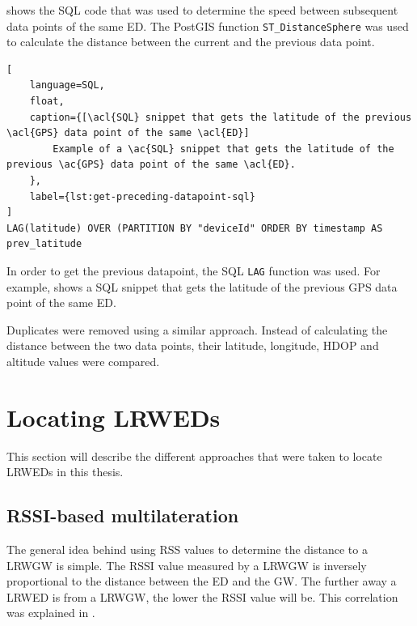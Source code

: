  shows the \ac{SQL} code that was used to determine the speed between subsequent data points of the same \acl{ED}.
The PostGIS function \lstinline|ST_DistanceSphere| was used to calculate the distance between the current and the previous data point.

\begin{lstlisting}[
    language=SQL,
    float,
    caption={[\acl{SQL} snippet that gets the latitude of the previous \acl{GPS} data point of the same \acl{ED}]
        Example of a \ac{SQL} snippet that gets the latitude of the previous \ac{GPS} data point of the same \acl{ED}.
    },
    label={lst:get-preceding-datapoint-sql}
]
LAG(latitude) OVER (PARTITION BY "deviceId" ORDER BY timestamp AS prev_latitude
\end{lstlisting}

In order to get the previous datapoint, the SQL \lstinline|LAG| function was used.
For example,  shows a \ac{SQL} snippet that gets the latitude of the previous \ac{GPS} data point of the same \acl{ED}.

Duplicates were removed using a similar approach.
Instead of calculating the distance between the two data points, their latitude, longitude, \ac{HDOP} and altitude values were compared.

\section{Locating \aclp{LRWED}}

This section will describe the different approaches that were taken to locate \aclp{LRWED} in this thesis.

\subsection{\acs{RSSI}-based multilateration}\label{sec:rssi-based-multilateration-implementation}

The general idea behind using \ac{RSS} values to determine the distance to a \acl{LRWGW} is simple.
The \ac{RSSI} value measured by a \acl{LRWGW} is inversely proportional to the distance between the \acl{ED} and the \acl{GW}.
The further away a \acl{LRWED} is from a \acl{LRWGW}, the lower the \ac{RSSI} value will be.
This correlation was explained in .

